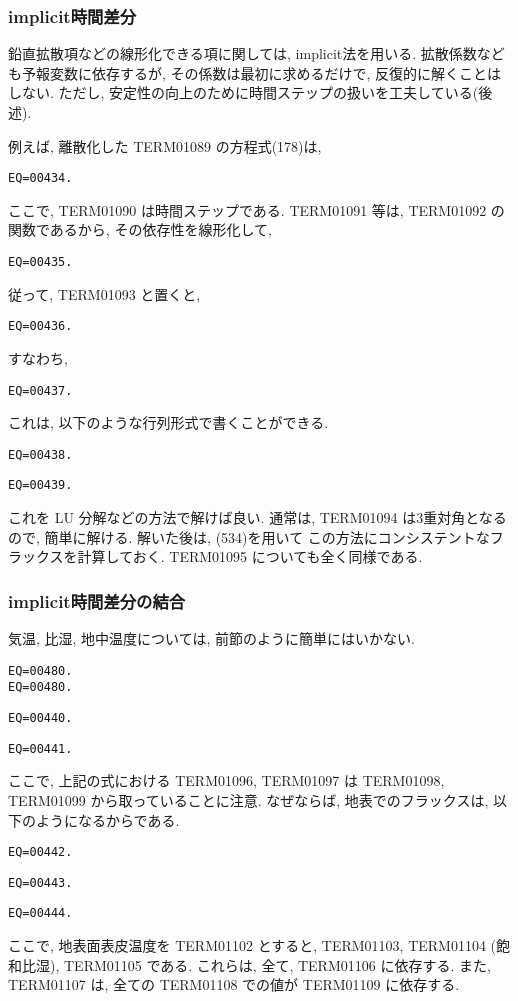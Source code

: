 \subsubsection{implicit時間差分}

鉛直拡散項などの線形化できる項に関しては, implicit法を用いる.
拡散係数なども予報変数に依存するが,
その係数は最初に求めるだけで, 反復的に解くことはしない.
ただし, 安定性の向上のために時間ステップの扱いを工夫している(後述). 

例えば, 離散化した TERM01089 の方程式(178)は,
%
\begin{verbatim}
EQ=00434.
\end{verbatim}
ここで, TERM01090 は時間ステップである.
TERM01091 等は, TERM01092 の関数であるから, その依存性を線形化して,
%
\begin{verbatim}
EQ=00435.
\end{verbatim}

従って, TERM01093 と置くと,
%
\begin{verbatim}
EQ=00436.
\end{verbatim}
%
すなわち,
\begin{verbatim}
EQ=00437.
\end{verbatim}

これは, 以下のような行列形式で書くことができる.
%
\begin{verbatim}
EQ=00438.
\end{verbatim}
%
\begin{verbatim}
EQ=00439.
\end{verbatim}
%
これを LU 分解などの方法で解けば良い.
通常は, TERM01094 は3重対角となるので, 簡単に解ける.
解いた後は, (534)を用いて
この方法にコンシステントなフラックスを計算しておく.
TERM01095 についても全く同様である.

\subsubsection{implicit時間差分の結合}

気温, 比湿, 地中温度については, 前節のように簡単にはいかない.
%
\begin{verbatim}
EQ=00480.
EQ=00480.
\end{verbatim}
%
\begin{verbatim}
EQ=00440.
\end{verbatim}
%
\begin{verbatim}
EQ=00441.
\end{verbatim}
%
ここで, 上記の式における TERM01096, TERM01097 は
TERM01098, TERM01099 から取っていることに注意. なぜならば,
地表でのフラックスは, 以下のようになるからである.
\begin{verbatim}
EQ=00442.
\end{verbatim}
\begin{verbatim}
EQ=00443.
\end{verbatim}
\begin{verbatim}
EQ=00444.
\end{verbatim}
ここで, 地表面表皮温度を TERM01102 とすると,
TERM01103, TERM01104 (飽和比湿), TERM01105 である.
これらは, 全て, TERM01106 に依存する.
また, TERM01107 は, 全ての TERM01108 での値が TERM01109 に依存する. 

